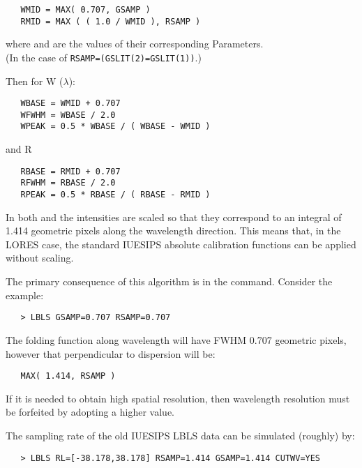 \begin{verbatim}
   WMID = MAX( 0.707, GSAMP )
   RMID = MAX ( ( 1.0 / WMID ), RSAMP )
\end{verbatim}

where 
 and 
 are the values of their corresponding
Parameters.\\  (In the case of 
 \verb+RSAMP=(GSLIT(2)=GSLIT(1))+.\@)

Then for W ($\lambda$):

\begin{verbatim}
   WBASE = WMID + 0.707
   WFWHM = WBASE / 2.0
   WPEAK = 0.5 * WBASE / ( WBASE - WMID )
\end{verbatim}

and R

\begin{verbatim}
   RBASE = RMID + 0.707
   RFWHM = RBASE / 2.0
   RPEAK = 0.5 * RBASE / ( RBASE - RMID )
\end{verbatim}

In both 
 and 
 the intensities are scaled so that they
correspond to an integral of 1.414 geometric pixels along the wavelength
direction.  This means that, in the LORES case, the standard IUESIPS absolute
calibration functions can be applied without scaling.

The primary consequence of this algorithm is in the
 command.
Consider the example:

\begin{verbatim}
   > LBLS GSAMP=0.707 RSAMP=0.707
\end{verbatim}

The folding function along wavelength will have FWHM 0.707 geometric pixels,
however that perpendicular to dispersion will be:

\begin{verbatim}
   MAX( 1.414, RSAMP )
\end{verbatim}

If it is needed to obtain high spatial resolution, then wavelength resolution
must be forfeited by adopting a higher 
 value.

The sampling rate of the old IUESIPS LBLS data can be simulated (roughly) by:

\begin{verbatim}
   > LBLS RL=[-38.178,38.178] RSAMP=1.414 GSAMP=1.414 CUTWV=YES
\end{verbatim}

